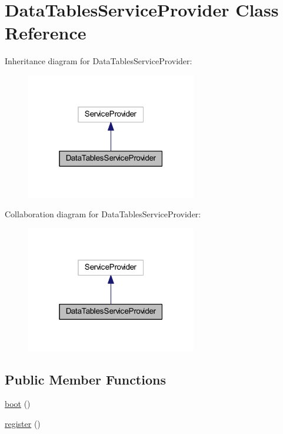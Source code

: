 \hypertarget{classhamburgscleanest_1_1_data_tables_1_1_data_tables_service_provider}{}\section{Data\+Tables\+Service\+Provider Class Reference}
\label{classhamburgscleanest_1_1_data_tables_1_1_data_tables_service_provider}


Inheritance diagram for Data\+Tables\+Service\+Provider\+:
\nopagebreak
\begin{figure}[H]
\begin{center}
\leavevmode
\includegraphics[width=211pt]{classhamburgscleanest_1_1_data_tables_1_1_data_tables_service_provider__inherit__graph}
\end{center}
\end{figure}


Collaboration diagram for Data\+Tables\+Service\+Provider\+:
\nopagebreak
\begin{figure}[H]
\begin{center}
\leavevmode
\includegraphics[width=211pt]{classhamburgscleanest_1_1_data_tables_1_1_data_tables_service_provider__coll__graph}
\end{center}
\end{figure}
\subsection*{Public Member Functions}
\begin{DoxyCompactItemize}
\item 
\hyperlink{classhamburgscleanest_1_1_data_tables_1_1_data_tables_service_provider_a8814ea4b5beba763c570b4818980814e}{boot} ()
\item 
\hyperlink{classhamburgscleanest_1_1_data_tables_1_1_data_tables_service_provider_acc294a6cc8e69743746820e3d15e3f78}{register} ()
\end{DoxyCompactItemize}


